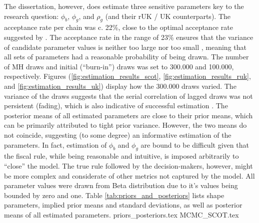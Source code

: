 The dissertation, however, does estimate three sensitive parameters key to the research question: $\phi_b$, $\phi_g$, and $\rho_g$ (and their rUK / UK counterparts). The acceptance rate per chain was c. 22\%, close to the optimal acceptance rate suggested by \textcite{roberts_2001_optimal}. The acceptance rate in the range of 23\% ensures that the variance of candidate parameter values is neither too large nor too small \parencite{roberts_2001_optimal}, meaning that all sets of parameters had a reasonable probability of being drawn. The number of MH draws and initial (``burn-in'') draws was set to 300.000 and 100.000, respectively. Figures (\ref{fig:estimation_results_scot}, \ref{fig:estimation_results_ruk}, and \ref{fig:estimation_results_uk}) display how the 300.000 draws varied. The variance of the draws suggests that the serial correlation of lagged draws was not persistent (fading), which is also indicative of successful estimation \parencite{roberts_2001_optimal}. The posterior means of all estimated parameters are close to their prior means, which can be primarily attributed to tight prior variance. However, the two means do not coincide, suggesting (to some degree) an informative estimation of the parameters. In fact, estimation of $\phi_b$ and $\phi_g$ are bound to be difficult given that the fiscal rule, while being reasonable and intuitive, is imposed arbitrarily to ``close'' the model. The true rule followed by the decision-makers, however, might be more complex and considerate of other metrics not captured by the model. All parameter values were drawn from Beta distribution due to it's values being bounded by zero and one. Table \ref{tab:priors_and_posteriors} lists shape parameters, implied prior means and standard deviations, as well as posterior means of all estimated parameters. 
{priors_posteriors.tex}
{MCMC_SCOT.tex}
